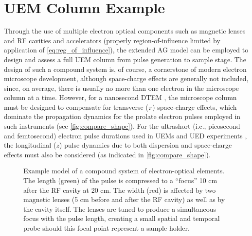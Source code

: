 
\section{UEM Column Example} \label{sec:compound}

Through the use of multiple electron optical components such as magnetic lenses and RF cavities and accelerators (properly region-of-influence limited by application of \ref{eq:reg_of_influence}), the extended AG model can be employed to design and assess a full UEM column from pulse generation to sample stage.
The design of such a compound system is, of course, a cornerstone of modern electron microscope development, although space-charge effects are generally not included, since, on average, there is usually no more than one electron in the microscope column at a time.
However, for a nanosecond DTEM \cite{lagrange_nanosecond_2008,reed_evolution_2009}, the microscope column must be designed to compensate for transverse (${\scriptscriptstyle T}$) space-charge effects, which dominate the propagation dynamics for the prolate electron pulses employed in such instruments (see \ref{fig:compare_shape}).
For the ultrashort (i.e., picosecond and femtosecond) electron pulse durations used in UEMs \cite{park_direct_2009} and UED experiments \cite{oudheusden_electron_2007}, the longitudinal ($z$) pulse dynamics due to both dispersion and space-charge effects must also be considered (as indicated in \ref{fig:compare_shape}).

\begin{figure}
  \centering
  
  \caption[Example model of a compound system of electron-optical elements]{
    Example model of a compound system of electron-optical elements.
    The length (green) of the pulse is compressed to a ``focus'' 10 cm after the RF cavity at 20 cm.
    The width (red) is affected by two magnetic lenses (5 cm before and after the RF cavity) as well as by the cavity itself.
    The lenses are tuned to produce a simultaneous focus with the pulse length, creating a small spatial and temporal probe should this focal point represent a sample holder.
  }
  \label{fig:compound}
\end{figure}

